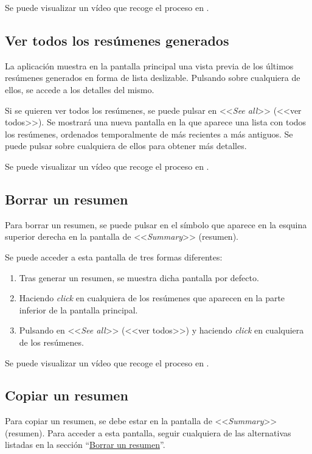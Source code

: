 Se puede visualizar un vídeo que recoge el proceso en \href{}{}.

\subsection{Ver todos los resúmenes generados}

La aplicación muestra en la pantalla principal una vista previa de los últimos resúmenes generados en forma de lista deslizable. Pulsando sobre cualquiera de ellos, se accede a los detalles del mismo.

Si se quieren ver todos los resúmenes, se puede pulsar en <<\emph{See all}>> (<<ver todos>>). Se mostrará una nueva pantalla en la que aparece una lista con todos los resúmenes, ordenados temporalmente de más recientes a más antiguos. Se puede pulsar sobre cualquiera de ellos para obtener más detalles.

Se puede visualizar un vídeo que recoge el proceso en \href{}{}.

\subsection{Borrar un resumen} \label{subsection:borrar}

Para borrar un resumen, se puede pulsar en el símbolo que aparece en la esquina superior derecha en la pantalla de <<\emph{Summary}>> (resumen).

Se puede acceder a esta pantalla de tres formas diferentes:

\begin{enumerate}
	\item Tras generar un resumen, se muestra dicha pantalla por defecto.
	
	\item Haciendo \emph{click} en cualquiera de los resúmenes que aparecen en la parte inferior de la pantalla principal.
	
	\item Pulsando en <<\emph{See all}>> (<<ver todos>>) y haciendo \emph{click} en cualquiera de los resúmenes.
\end{enumerate}

Se puede visualizar un vídeo que recoge el proceso en \href{}{}.

\subsection{Copiar un resumen}

Para copiar un resumen, se debe estar en la pantalla de <<\emph{Summary}>> (resumen). Para acceder a esta pantalla, seguir cualquiera de las alternativas listadas en la sección ``\hyperref[subsection:borrar]{Borrar un resumen}''.

